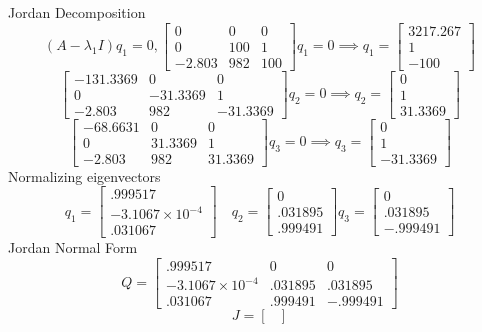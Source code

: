 \documentclass{article}
\begin{document}
\begin{enumerate}[a.]
$$$$
Jordan Decomposition
$$
(A-\lambda_1 I)q_1=0,
\begin{bmatrix}
0 & 0 & 0 \\
0 & 100 & 1 \\
-2.803 & 982 & 100
\end{bmatrix}
q_1
=
0
\implies
q_1 = \begin{bmatrix} 3217.267 \\ 1 \\ -100 \end{bmatrix}
$$
$$
\begin{bmatrix}
-131.3369 & 0 & 0 \\
0 & -31.3369 & 1 \\
-2.803 & 982 &-31.3369 
\end{bmatrix}
q_2
=0
\implies
q_2 = \begin{bmatrix} 0 \\ 1 \\ 31.3369 \end{bmatrix}
$$
$$
\begin{bmatrix}
-68.6631 & 0 & 0 \\
0 & 31.3369 & 1 \\
-2.803 & 982 & 31.3369
\end{bmatrix}
q_3
=
0
\implies
q_3 = \begin{bmatrix} 0 \\ 1 \\ -31.3369 \end{bmatrix}
$$
Normalizing eigenvectors
$$
q_1=
\begin{bmatrix} .999517 \\ -3.1067\times10^{-4} \\ .031067 \end{bmatrix}
\quad
q_2=
\begin{bmatrix} 0 \\ .031895 \\ .999491 \end{bmatrix}
q_3=
\begin{bmatrix} 0 \\ .031895 \\ -.999491 \end{bmatrix}
$$
Jordan Normal Form
$$
Q
=
\begin{bmatrix}
.999517             & 0 & 0 \\
-3.1067\times10^{-4} & .031895 & .031895 \\
.031067            & .999491 & -.999491
\end{bmatrix}
$$
$$
J
=
\begin{bmatrix}

\end{bmatrix}$$
\end{enumerate}
\end{document}
